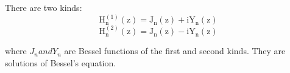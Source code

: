 There are two kinds:
\[ \mathrm{H}_{\mathrm{n}}^{(1)} (\mathrm{z})
= \mathrm{J}_{\mathrm{n}} (\mathrm{z}) + \mathrm{iY}_{\mathrm{n}}(\mathrm{z}) \]
\[ \mathrm{H}_{\mathrm{n}}^{(2)} (\mathrm{z})
= \mathrm{J}_{\mathrm{n}} (\mathrm{z}) - \mathrm{iY}_{\mathrm{n}}(\mathrm{z}) \]
\par
where $J_{n} and Y_{n}$  are Bessel functions of the 
first and second kinds. They are solutions of Bessel's equation.